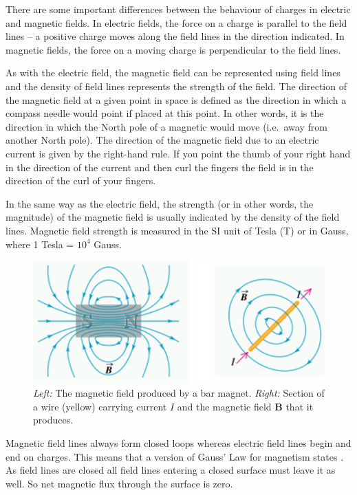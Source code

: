 \documentclass[
  letterpaper,
  DIV=11,
  numbers=noendperiod]{scrreprt}
\begin{document}
There are some important differences between the behaviour of charges in
electric and magnetic fields. In electric fields, the force on a charge
is parallel to the field lines -- a positive charge moves along the
field lines in the direction indicated. In magnetic fields, the force on
a moving charge is perpendicular to the field lines.

As with the electric field, the magnetic field can be represented using
field lines and the density of field lines represents the strength of
the field. The direction of the magnetic field at a given point in space
is defined as the direction in which a compass needle would point if
placed at this point. In other words, it is the direction in which the
North pole of a magnetic would move (i.e.~away from another North pole).
The direction of the magnetic field due to an electric current is given
by the right-hand rule. If you point the thumb of your right hand in the
direction of the current and then curl the fingers the field is in the
direction of the curl of your fingers.

In the same way as the electric field, the strength (or in other words,
the magnitude) of the magnetic field is usually indicated by the density
of the field lines. Magnetic field strength is measured in the SI unit
of Tesla (T) or in Gauss, where 1 Tesla = \(10^4\) Gauss.

\begin{figure}[H]

{\centering \includegraphics[width=5.20833in,height=\textheight]{Figures/MagFields.png}

}

\caption{\emph{Left:} The magnetic field produced by a bar magnet.
\emph{Right:} Section of a wire (yellow) carrying current \(I\) and the
magnetic field \(\mathrm{\mathbf{B}}\) that it produces.}

\end{figure}%

Magnetic field lines always form closed loops whereas electric field
lines begin and end on charges. This means that a version of Gauss' Law
for magnetism states . As field lines are closed all field lines
entering a closed surface must leave it as well. So net magnetic flux
through the surface is zero.
\end{document}
